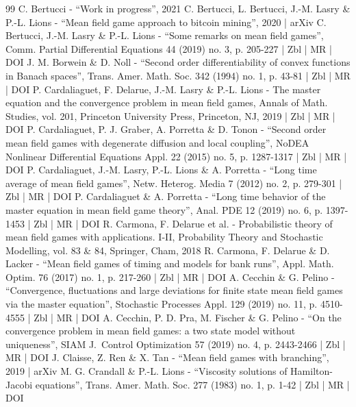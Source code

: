 \documentclass[10pt]{amsart}
\theoremstyle{definition}
\begin{document}
\begin{thebibliography}{99}
C. Bertucci - “Work in progress”, 2021
C. Bertucci, L. Bertucci, J.-M. Lasry \& P.-L. Lions - “Mean field game approach to bitcoin mining”, 2020 | arXiv
C. Bertucci, J.-M. Lasry \& P.-L. Lions - “Some remarks on mean field games”, Comm. Partial Differential Equations 44 (2019) no. 3, p. 205-227 | Zbl | MR | DOI
J. M. Borwein \& D. Noll - “Second order differentiability of convex functions in Banach spaces”, Trans. Amer. Math. Soc. 342 (1994) no. 1, p. 43-81 | Zbl | MR | DOI
P. Cardaliaguet, F. Delarue, J.-M. Lasry \& P.-L. Lions - The master equation and the convergence problem in mean field games, Annals of Math. Studies, vol. 201, Princeton University Press, Princeton, NJ, 2019 | Zbl | MR | DOI
P. Cardaliaguet, P. J. Graber, A. Porretta \& D. Tonon - “Second order mean field games with degenerate diffusion and local coupling”, NoDEA Nonlinear Differential Equations Appl. 22 (2015) no. 5, p. 1287-1317 | Zbl | MR | DOI
P. Cardaliaguet, J.-M. Lasry, P.-L. Lions \& A. Porretta - “Long time average of mean field games”, Netw. Heterog. Media 7 (2012) no. 2, p. 279-301 | Zbl | MR | DOI
P. Cardaliaguet \& A. Porretta - “Long time behavior of the master equation in mean field game theory”, Anal. PDE 12 (2019) no. 6, p. 1397-1453 | Zbl | MR | DOI
R. Carmona, F. Delarue et al. - Probabilistic theory of mean field games with applications. I-II, Probability Theory and Stochastic Modelling, vol. 83 \& 84, Springer, Cham, 2018
R. Carmona, F. Delarue \& D. Lacker - “Mean field games of timing and models for bank runs”, Appl. Math. Optim. 76 (2017) no. 1, p. 217-260 | Zbl | MR | DOI
A. Cecchin \& G. Pelino - “Convergence, fluctuations and large deviations for finite state mean field games via the master equation”, Stochastic Processes Appl. 129 (2019) no. 11, p. 4510-4555 | Zbl | MR | DOI
A. Cecchin, P. D. Pra, M. Fischer \& G. Pelino - “On the convergence problem in mean field games: a two state model without uniqueness”, SIAM J. Control Optimization 57 (2019) no. 4, p. 2443-2466 | Zbl | MR | DOI
J. Claisse, Z. Ren \& X. Tan - “Mean field games with branching”, 2019 | arXiv
M. G. Crandall \& P.-L. Lions - “Viscosity solutions of Hamilton-Jacobi equations”, Trans. Amer. Math. Soc. 277 (1983) no. 1, p. 1-42 | Zbl | MR | DOI

\end{thebibliography}
\end{document}
